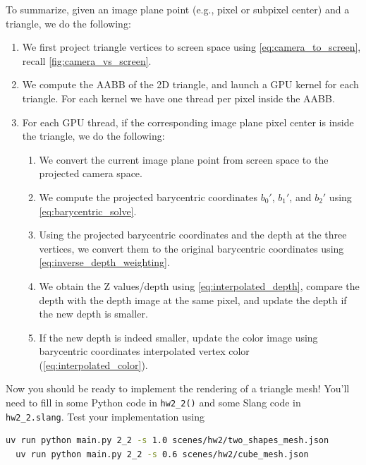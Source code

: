 To summarize, given an image plane point (e.g., pixel or subpixel center) and a triangle, we do the following:
\vspace{30pt}
\begin{enumerate}
    \item We first project triangle vertices to screen space using
    \cref{eq:camera_to_screen}, recall \cref{fig:camera_vs_screen}.

    \item We compute the AABB of the 2D triangle, and launch a GPU
    kernel for each triangle. For each kernel we have one thread
    per pixel inside the AABB.

    \item For each GPU thread, if the corresponding image plane
    pixel center is inside the triangle, we do the following:
    \begin{enumerate}
        \item We convert the current image plane point from screen
        space to the projected camera space.

        \item We compute the projected barycentric coordinates
        $b_0'$, $b_1'$, and $b_2'$ using
        \cref{eq:barycentric_solve}.

        \item Using the projected barycentric coordinates and the
        depth at the three vertices, we convert them to the original
        barycentric coordinates using \cref{eq:inverse_depth_weighting}.

        \item We obtain the Z values/depth using
        \cref{eq:interpolated_depth}, compare the depth with the
        depth image at the same pixel, and update the depth if
        the new depth is smaller.

        \item If the new depth is indeed smaller, update the color
        image using barycentric coordinates interpolated vertex
        color (\cref{eq:interpolated_color}).
    \end{enumerate}
\end{enumerate}

Now you should be ready to implement the rendering of a triangle mesh! You'll need to fill in some Python code in \lstinline{hw2_2()} and some Slang code in \lstinline{hw2_2.slang}. Test your implementation using
\begin{lstlisting}[language=bash]
  uv run python main.py 2_2 -s 1.0 scenes/hw2/two_shapes_mesh.json
  uv run python main.py 2_2 -s 0.6 scenes/hw2/cube_mesh.json
\end{lstlisting}

